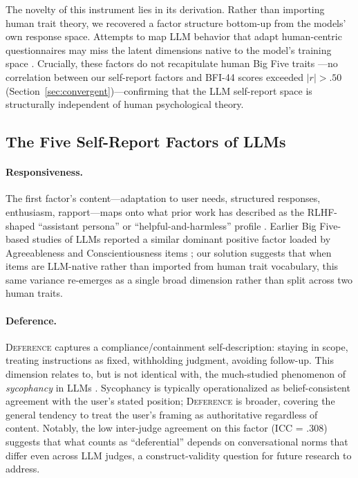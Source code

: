 \documentclass[11pt]{article}
\newcommand{\factorname}[1]{\textsc{#1}}
\begin{document}
The novelty of this instrument lies in its derivation. Rather than importing human trait theory, we recovered a factor structure bottom-up from the models' own response space. Attempts to map LLM behavior that adapt human-centric questionnaires may miss the latent dimensions native to the model's training space \citep{Peereboom_2025, gupta2024self}. Crucially, these factors do not recapitulate human Big Five traits \citep{john1999big}---no correlation between our self-report factors and BFI-44 scores exceeded $|r| > .50$ (Section~\ref{sec:convergent})---confirming that the LLM self-report space is structurally independent of human psychological theory.

\subsection{The Five Self-Report Factors of LLMs}
\label{sec:discussion-factor-links}

\paragraph{Responsiveness.}
The first factor's content---adaptation to user needs, structured responses, enthusiasm, rapport---maps onto what prior work has described as the RLHF-shaped ``assistant persona'' or ``helpful-and-harmless'' profile \citep{serapio2025personality, bai2022constitutional, askell2021generallanguageassistantlaboratory}.
Earlier Big Five-based studies of LLMs reported a similar dominant positive factor loaded by Agreeableness and Conscientiousness items \citep{serapio2025personality,jiang2023mpi}; our solution suggests that when items are LLM-native rather than imported from human trait vocabulary, this same variance re-emerges as a single broad dimension rather than split across two human traits.

\paragraph{Deference.}
\factorname{Deference} captures a compliance/containment self-description: staying in scope, treating instructions as fixed, withholding judgment, avoiding follow-up.
This dimension relates to, but is not identical with, the much-studied phenomenon of \emph{sycophancy} in LLMs \citep{sharma2023sycophancy, perez2022discovering}.
Sycophancy is typically operationalized as belief-consistent agreement with the user's stated position; \factorname{Deference} is broader, covering the general tendency to treat the user's framing as authoritative regardless of content.
Notably, the low inter-judge agreement on this factor (ICC = .308) suggests that what counts as ``deferential'' depends on conversational norms that differ even across LLM judges, a construct-validity question for future research to address.
\end{document}

